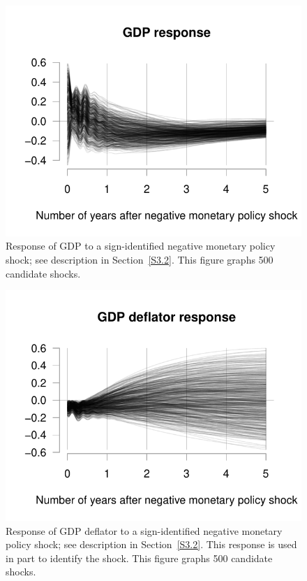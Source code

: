 \documentclass[12pt,fleqn]{article}
\begin{document}
\begin{figure}[t]
  \centering
  \includegraphics{graphs/empirics_GDPM}
  \caption{%
    Response of GDP to a sign-identified negative monetary policy
    shock; see description in Section~\ref{S3.2}. This figure graphs
    500 candidate shocks.}
  \label{fig:5}
\end{figure}

\begin{figure}[t]
  \centering
  \includegraphics{graphs/empirics_PGDPM}
  \caption{%
    Response of GDP deflator to a sign-identified negative monetary
    policy shock; see description in Section~\ref{S3.2}. This response
    is used in part to identify the shock. This figure graphs 500
    candidate shocks.}
  \label{fig:6}
\end{figure}
\end{document}
